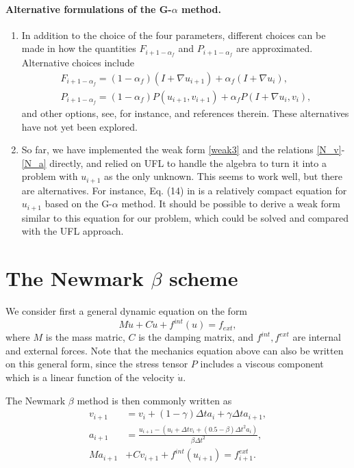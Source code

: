 \documentclass[a4paper,10pt]{article}
\begin{document}
\paragraph{Alternative formulations of the G-$\alpha$ method.}
\begin{enumerate}
  \item In addition to the choice of the four parameters, different choices
  can be made in how the quantities $F_{i+1-\alpha_f}$ and $P_{i+1-\alpha_f}$
  are approximated. Alternative choices include
  \begin{align*}
   F_{i+1-\alpha_f} = (1-\alpha_f) (I + \nabla u_{i+1}) + \alpha_f(I + \nabla u_{i}), \\
   P_{i+1-\alpha_f} = (1-\alpha_f) P(u_{i+1}, v_{i+1}) + \alpha_f P (I + \nabla u_{i}, v_{i}) ,
 \end{align*}
 and other options, see, for instance, \cite{erlicher2002analysis} and references therein.
 These alternatives have not yet been explored.

 \item So far, we have implemented the weak form \eqref{weak3} and the relations
 \eqref{N_v}-\eqref{N_a} directly, and relied on UFL to handle the algebra to turn it
 into a problem with $u_{i+1}$ as the only unknown. This seems to work well, but
 there are alternatives. For instance, Eq. (14) in \cite{erlicher2002analysis} is
 a relatively compact equation for $u_{i+1}$ based on the G-$\alpha$ method. It should
 be possible to derive a weak form similar to this equation for our problem, which could be
 solved and compared with the UFL approach.
\end{enumerate}


\appendix
\section{The Newmark $\beta$ scheme}
We consider first a general dynamic equation on the form
\[
M\ddot{u} + C\dot{u} + f^{int}(u) = f_{ext},
\]
where $M$ is the mass matric, $C$ is the damping matrix, and $f^{int}, f^{ext}$
are internal and external forces. Note that the mechanics equation above can also
be written on this general form, since the stress tensor $P$ includes a viscous
component which is a linear function of the velocity $\dot{u}$.

The Newmark $\beta$ method
is then commonly written as
\begin{align}
v_{i+1} &= v_i + (1-\gamma) \Delta t a_i + \gamma \Delta t a_{i+1}, \\
a_{i+1} &= \frac{u_{i+1} - (u_i + \Delta t v_i + (0.5 - \beta) \Delta t^2 a_i)}{\beta \Delta t^2}, \\
Ma_{i+1} &+ C v_{i+1} + f^{int}(u_{i+1}) = f^{ext}_{i+1} .
\end{align}
\end{document}
